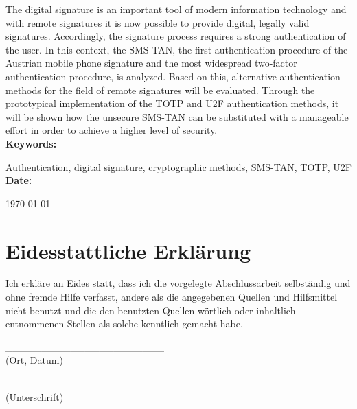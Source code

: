 The digital signature is an important tool of modern information technology and with remote signatures it is now possible to provide digital, legally valid signatures. Accordingly, the signature process requires a strong authentication of the user. In this context, the SMS-TAN, the first authentication procedure of the Austrian mobile phone signature and the most widespread two-factor authentication procedure, is analyzed. Based on this, alternative authentication methods for the field of remote signatures will be evaluated. Through the prototypical implementation of the TOTP and U2F authentication methods, it will be shown how the unsecure SMS-TAN can be substituted with a manageable effort in order to achieve a higher level of security.
\\[4ex]
\textbf{Keywords:}

Authentication, digital signature, cryptographic methods, SMS-TAN, TOTP, U2F
\\[4ex]
\textbf{Date:}

\today
\clearpage

\chapter*{Eidesstattliche Erklärung}
Ich erkläre an Eides statt, dass ich die vorgelegte Abschlussarbeit selbständig und ohne fremde Hilfe verfasst, andere als die angegebenen Quellen und Hilfsmittel nicht benutzt und die den benutzten Quellen wörtlich oder inhaltlich entnommenen Stellen als solche kenntlich gemacht habe.

\vspace{1.5cm}

\_\_\_\_\_\_\_\_\_\_\_\_\_\_\_\_\_\_\_\_\_\_ \\
(Ort, Datum)

\vspace{0.5cm}

\_\_\_\_\_\_\_\_\_\_\_\_\_\_\_\_\_\_\_\_\_\_ \\
(Unterschrift)

\clearpage